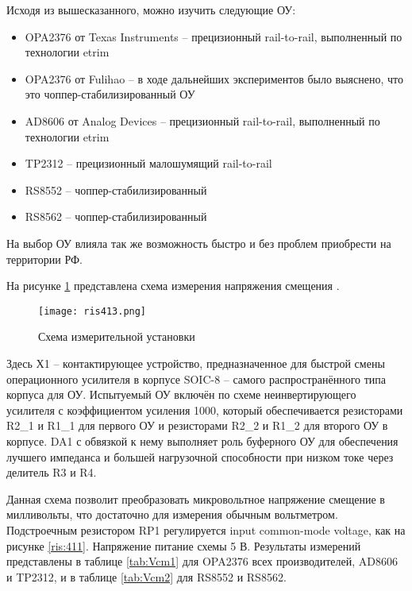 Исходя из вышесказанного, можно изучить следующие ОУ:

\begin{itemize}
    \item OPA2376 от Texas Instruments -- прецизионный rail-to-rail, выполненный по технологии etrim
    \item OPA2376 от Fulihao -- в ходе дальнейших экспериментов было выяснено, что это 
    чоппер-стабилизированный ОУ
    \item AD8606 от Analog Devices -- прецизионный rail-to-rail, выполненный по технологии etrim
    \item TP2312 -- прецизионный малошумящий rail-to-rail
    \item RS8552 -- чоппер-стабилизированный
    \item RS8562 -- чоппер-стабилизированный
\end{itemize}

На выбор ОУ влияла так же возможность быстро и без проблем приобрести на территории РФ. 

На рисунке \ref{ris:413} представлена схема измерения напряжения смещения \cite{Simple Op Amp Measurements} 
\cite{GOST 23089.3-83}.

\begin{figure}[H]
    \centering
    \texttt{[image: ris413.png]}
    \caption{Схема измерительной установки}
    \label{ris:413}
    \end{figure}

Здесь Х1 -- контактирующее устройство, предназначенное для быстрой смены операционного усилителя в 
корпусе SOIC-8 -- самого распространённого типа корпуса для ОУ. Испытуемый ОУ включён по схеме неинвертирующего 
усилителя с коэффициентом усиления 1000, который обеспечивается резисторами R2\_1 и R1\_1 для первого ОУ и
резисторами R2\_2 и R1\_2 для второго ОУ в корпусе. DA1 с обвязкой к нему выполняет роль буферного ОУ для 
обеспечения лучшего импеданса и большей нагрузочной способности при низком токе через делитель R3 и R4.

Данная схема позволит преобразовать микровольтное напряжение смещение в милливольты, что достаточно для 
измерения обычным вольтметром. Подстроечным резистором RP1 регулируется input common-mode voltage, как 
на рисунке \ref{ris:411}. Напряжение питание схемы 5 В. Результаты измерений представлены в таблице
\ref{tab:Vcm1} для OPA2376 всех производителей, AD8606 и TP2312, и в таблице \ref{tab:Vcm2} для RS8552 и 
RS8562.

